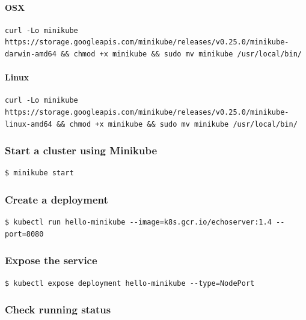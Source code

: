 \paragraph{OSX}\label{osx}

\begin{verbatim}
curl -Lo minikube https://storage.googleapis.com/minikube/releases/v0.25.0/minikube-darwin-amd64 && chmod +x minikube && sudo mv minikube /usr/local/bin/
\end{verbatim}

\paragraph{Linux}\label{linux}

\begin{verbatim}
curl -Lo minikube https://storage.googleapis.com/minikube/releases/v0.25.0/minikube-linux-amd64 && chmod +x minikube && sudo mv minikube /usr/local/bin/
\end{verbatim}

\subsubsection{Start a cluster using
Minikube}\label{start-a-cluster-using-minikube}

\begin{verbatim}
$ minikube start
\end{verbatim}

\subsubsection{Create a deployment}\label{create-a-deployment}

\begin{verbatim}
$ kubectl run hello-minikube --image=k8s.gcr.io/echoserver:1.4 --port=8080
\end{verbatim}

\subsubsection{Expose the service}\label{expose-the-service}

\begin{verbatim}
$ kubectl expose deployment hello-minikube --type=NodePort
\end{verbatim}

\subsubsection{Check running status}\label{check-running-status}

